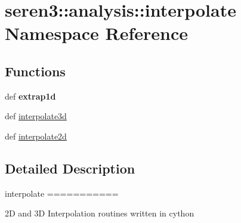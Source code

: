 \hypertarget{namespaceseren3_1_1analysis_1_1interpolate}{
\section{seren3::analysis::interpolate Namespace Reference}
\label{namespaceseren3_1_1analysis_1_1interpolate}
}
\subsection*{Functions}
\begin{DoxyCompactItemize}
\item 
\hypertarget{namespaceseren3_1_1analysis_1_1interpolate_a8b3daa90ae1ebb180b36061b583b3c86}{
def {\bfseries extrap1d}}
\label{namespaceseren3_1_1analysis_1_1interpolate_a8b3daa90ae1ebb180b36061b583b3c86}

\item 
def \hyperlink{namespaceseren3_1_1analysis_1_1interpolate_a6fd7ed3d3bb23ed9a25dd2bfa655ae66}{interpolate3d}
\item 
def \hyperlink{namespaceseren3_1_1analysis_1_1interpolate_a9da1592e0f683e03b44709c0f5cec544}{interpolate2d}
\end{DoxyCompactItemize}


\subsection{Detailed Description}
\begin{DoxyVerb}
interpolate
===========

2D and 3D Interpolation routines written in cython

\end{DoxyVerb}
 

